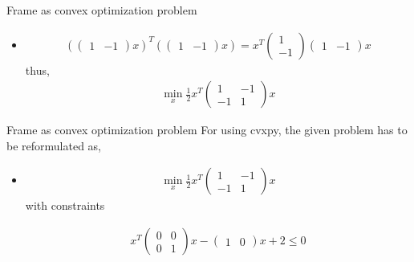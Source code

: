 \documentclass{beamer}
\begin{document}
\begin{frame}{Frame as convex optimization problem}

\begin{itemize}
  \item {
 \begin{align}
(\begin{pmatrix}
		1 & -1
		\end{pmatrix}x)^T (\begin{pmatrix}
		1 & -1
		\end{pmatrix}x)= x^{T}\begin{pmatrix}
		1 \\ -1
		\end{pmatrix}\begin{pmatrix}
		1 & -1
		\end{pmatrix}x
 \end{align}
 thus,
 \begin{align}
\min_x
  \frac{1}{2}x^T\begin{pmatrix}
		1 & -1\\
		-1 & 1
		\end{pmatrix}x
 \end{align}
  }
 \end{itemize}
  
\end{frame}

\begin{frame}{Frame as convex optimization problem}
For using cvxpy, the given problem has to be reformulated as,
  \begin{itemize}
  \item {
 \begin{align}
\min_x
  \frac{1}{2}x^T\begin{pmatrix}
		1 & -1\\
		-1 & 1
		\end{pmatrix}x
 \end{align}
 with constraints

  \begin{align}	
  x^{T}\begin{pmatrix}
		0 & 0\\
		0 & 1
		\end{pmatrix}x-\begin{pmatrix}
		1 & 0
		\end{pmatrix}x+2 \leq 0
 \end{align}
  }
 \end{itemize}

\end{frame}
\end{document}
